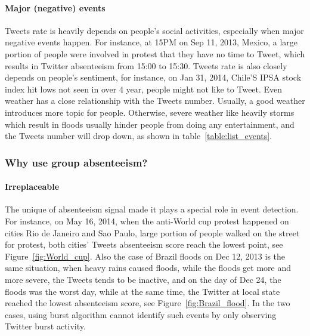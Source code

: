 \paragraph{Major (negative) events}
Tweets rate is heavily depends on people's social activities, especially when major negative events happen. For instance, at 15PM on Sep 11, 2013, Mexico, a large portion of people were involved in protest that they have no time to Tweet, which results in Twitter absenteeism from 15:00 to 15:30. Tweets rate is also closely depends on people's sentiment, for instance, on Jan 31, 2014, Chile'S IPSA stock index hit lows not seen in over 4 year, people might not like to Tweet. Even weather has a close relationship with the Tweets number. Usually, a good weather introduces more topic for people. Otherwise, severe weather like heavily storms which result in floods usually hinder people from doing any entertainment, and the Tweets number will drop down, as shown in table~\ref{table:list_events}.

\subsubsection{Why use group absenteeism?}
\paragraph{Irreplaceable}The unique of absenteeism signal made it plays a special role in event detection. For instance, on May 16, 2014, when the anti-World cup protest happened on cities Rio de Janeiro and Sao Paulo, large portion of people walked on the street for protest, both cities' Tweets absenteeism score reach the lowest point, see Figure~\ref{fig:World_cup}. Also the case of Brazil floods on Dec 12, 2013 is the same situation, when heavy rains caused floods, while the floods get more and more severe, the Tweets tends to be inactive, and on the day of Dec 24, the floods was the worst day, while at the same time, the Twitter at local state reached the lowest absenteeism score, see Figure~\ref{fig:Brazil_flood}. In the two cases, using burst algorithm cannot identify such events by only observing Twitter burst activity.

